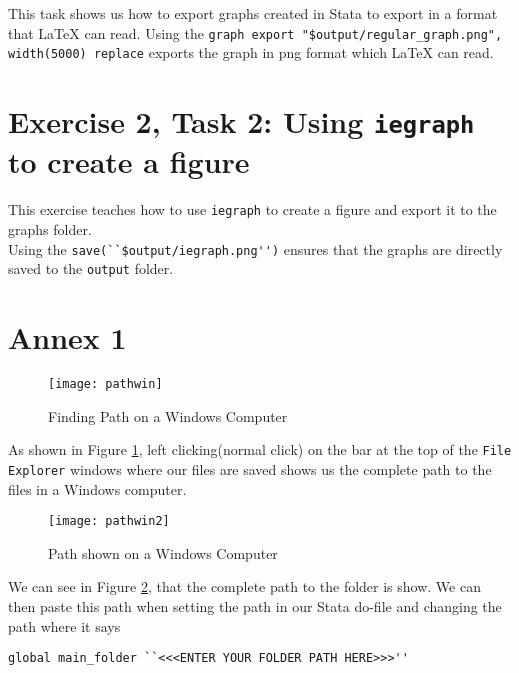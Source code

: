 \documentclass[]{article}
\begin{document}
This task shows us how to export graphs created in Stata to export in a format that {\LaTeX} can read. Using the \verb|graph export "$output/regular_graph.png", width(5000) replace| 
exports the graph in png format which {\LaTeX} can read. 
\section*{Exercise 2, Task 2: Using \texttt{iegraph} to create a figure}

This exercise teaches how to use \texttt{iegraph} to create a figure and export it to the graphs folder. \\

Using the \verb|save(``$output/iegraph.png'')| ensures that the graphs are directly saved to the \texttt{output} folder. 

\section*{Annex 1} {\label{annex1}}

\begin{figure}[H]
	\centering
	\texttt{[image: pathwin]}
	\caption{Finding Path on a Windows Computer}
	\label{fig:pathwin}
\end{figure}

As shown in Figure \ref{fig:pathwin}, left clicking(normal click) on the bar at the top of the \texttt{File Explorer} windows where our files are saved shows us the complete path to the files in a Windows computer. \\

\begin{figure}[H]
	\centering
	\texttt{[image: pathwin2]}
	\caption{Path shown on a Windows Computer}
	\label{fig:pathwin2}
\end{figure}

We can see in Figure \ref{fig:pathwin2}, that the complete path to the folder is show. We can then paste this path when setting the path in our Stata do-file and changing the path where it says \begin{verbatim}
global main_folder ``<<<ENTER YOUR FOLDER PATH HERE>>>''
\end{verbatim} 
	
\end{document}
